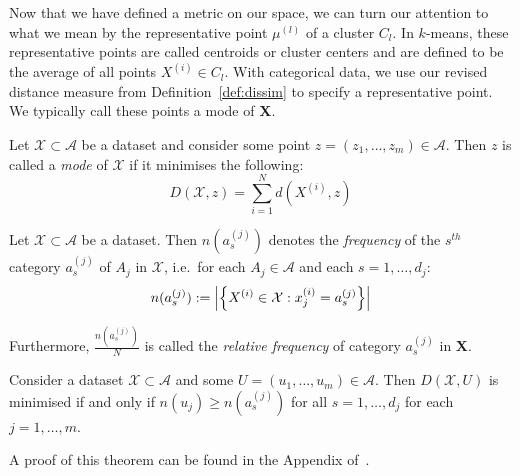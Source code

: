 Now that we have defined a metric on our space, we can turn our attention to
what we mean by the representative point \(\mu^{(l)}\) of a cluster \(C_l\). In
\(k\)-means, these representative points are called centroids or cluster centers
and are defined to be the average of all points \(X^{(i)} \in C_l\). With
categorical data, we use our revised distance measure from
Definition~\ref{def:dissim} to specify a representative point. We typically call
these points a mode of \textbf{X}.

\begin{definition}\label{def:mode}
    Let \(\mathcal{X} \subset \mathcal{A}\) be a dataset and consider some point
    \(z = \left(z_1, \ldots, z_m\right) \in \mathcal{A}\). Then \(z\) is called
    a \emph{mode} of \(\mathcal{X}\) if it minimises the following:
    \begin{equation}\label{eq:summed-dissim}
        D(\mathcal{X}, z) = \sum_{i=1}^{N} d\left(X^{(i)}, z\right)
    \end{equation}
\end{definition}

\begin{definition}\label{def:rel-freq}
    Let \(\mathcal{X} \subset \mathcal{A}\) be a dataset. Then \(n(a_s^{(j)})\)
    denotes the \emph{frequency} of the \(s^{th}\) category
    \(a_s^{(j)}\) of \(A_j\) in \(\mathcal{X}\), i.e.\ for each \(A_j \in
    \mathcal{A}\) and each \(s = 1, \ldots, d_j\):
    \begin{equation}
        n(a_s^{(j)}) := \abs*{%
            {\left\{X^{(i)} \in \mathcal{X}: x_j^{(i)} = a_s^{(j)}\right\}}
        }
    \end{equation}
	
    Furthermore, \(\frac{n(a_s^{(j)})}{N}\) is called the \emph{relative
    frequency} of category \(a_s^{(j)}\) in \textbf{X}.
\end{definition}

\begin{theorem}\label{thm:1}
    Consider a dataset \(\mathcal{X} \subset \mathcal{A}\) and some \(U = (u_1,
    \ldots, u_m) \in \mathcal{A}\). Then \(D(\mathcal{X}, U)\) is minimised if
    and only if \(n(u_j) \geq n(a_s^{(j)})\) for all \(s=1, \ldots, d_j\) for
    each \(j = 1, \ldots, m\).

    A proof of this theorem can be found in the Appendix of~\cite{Huang1998}.
\end{theorem}

%

